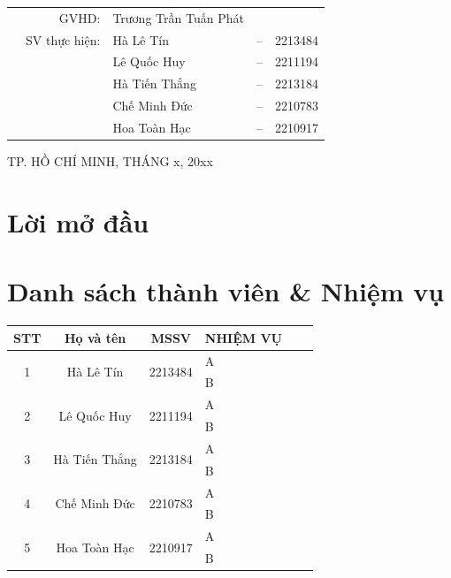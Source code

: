 \documentclass[a4paper]{article}
\begin{document}
\begin{titlepage}
	\begin{table}[h]
		\centering
		\begin{tabular}{rrlcl}
			\hspace{2.25 cm} & GVHD: & Trương Trần Tuấn Phát & & \\
			& SV thực hiện: & Hà Lê Tín   & -- & 2213484 \\
            & & Lê Quốc Huy & -- & 2211194\\
            & & Hà Tiến Thắng & -- & 2213184 \\
            & & Chế Minh Đức & -- & 2210783 \\
            & & Hoa Toàn Hạc & -- & 2210917 \\
		\end{tabular}
	\end{table}


\begin{center}
{\footnotesize TP. HỒ CHÍ MINH, THÁNG x, 20xx}
\end{center}
\end{titlepage}


\newpage
\tableofcontents
\newpage
\section*{Lời mở đầu}

\newpage
\section{Danh sách thành viên \& Nhiệm vụ }

\begin{center}
\begin{tabular}{|c|c|c|l|c|c|}
\hline
\textbf{STT} & \textbf{Họ và tên} & \textbf{MSSV} & \textbf{NHIỆM VỤ}\\
\hline 
\multirow{2}{*}{1} & \multirow{2}{*}{Hà Lê Tín} & \multirow{2}{*}{2213484} & A \\
 & &  & B\\
\hline 
\multirow{2}{*}{2} & \multirow{2}{*}{Lê Quốc Huy} & \multirow{2}{*}{2211194} & A \\
 & &  & B\\
\hline 
\multirow{2}{*}{3} & \multirow{2}{*}{Hà Tiến Thắng} & \multirow{2}{*}{2213184} & A \\
 & &  & B\\
\hline 
\multirow{2}{*}{4} & \multirow{2}{*}{Chế Minh Đức} & \multirow{2}{*}{2210783} & A \\
 & &  & B\\
\hline 
\multirow{2}{*}{5} & \multirow{2}{*}{Hoa Toàn Hạc} & \multirow{2}{*}{2210917} & A \\
 & &  & B\\
\hline 
\end{tabular}
\end{center}
\end{document}
